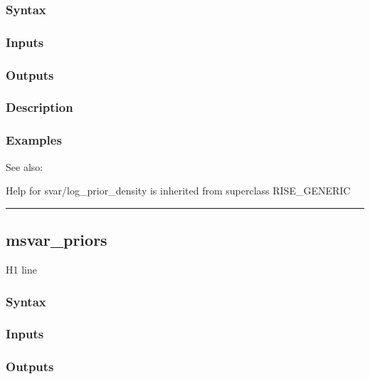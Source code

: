 \documentclass[letterpaper,10pt,english]{sphinxmanual}
\begin{document}
\subsubsection{Syntax}
\label{classes/models/@svar/svar:id63}

\subsubsection{Inputs}
\label{classes/models/@svar/svar:id64}

\subsubsection{Outputs}
\label{classes/models/@svar/svar:id65}

\subsubsection{Description}
\label{classes/models/@svar/svar:id66}

\subsubsection{Examples}
\label{classes/models/@svar/svar:id67}
See also:

Help for svar/log\_prior\_density is inherited from superclass RISE\_GENERIC


\bigskip\hrule{}\bigskip



\subsection{msvar\_priors}
\label{classes/models/@svar/svar:msvar-priors}\label{classes/models/@svar/svar:id68}
H1 line


\subsubsection{Syntax}
\label{classes/models/@svar/svar:id69}

\subsubsection{Inputs}
\label{classes/models/@svar/svar:id70}

\subsubsection{Outputs}
\label{classes/models/@svar/svar:id71}
\end{document}
